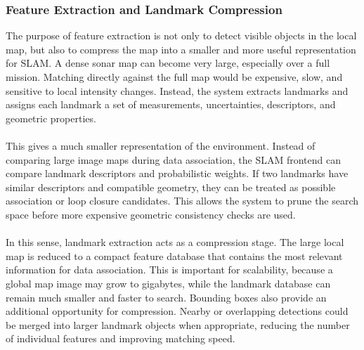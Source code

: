 \subsubsection{Feature Extraction and Landmark Compression}
The purpose of feature extraction is not only to detect visible objects in the local map, but also to compress the map into a smaller and more useful representation for SLAM. A dense sonar map can become very large, especially over a full mission. Matching directly against the full map would be expensive, slow, and sensitive to local intensity changes. Instead, the system extracts landmarks and assigns each landmark a set of measurements, uncertainties, descriptors, and geometric properties.
\\ \\
This gives a much smaller representation of the environment. Instead of comparing large image maps during data association, the SLAM frontend can compare landmark descriptors and probabilistic weights. If two landmarks have similar descriptors and compatible geometry, they can be treated as possible association or loop closure candidates. This allows the system to prune the search space before more expensive geometric consistency checks are used.
\\ \\
In this sense, landmark extraction acts as a compression stage. The large local map is reduced to a compact feature database that contains the most relevant information for data association. This is important for scalability, because a global map image may grow to gigabytes, while the landmark database can remain much smaller and faster to search. Bounding boxes also provide an additional opportunity for compression. Nearby or overlapping detections could be merged into larger landmark objects when appropriate, reducing the number of individual features and improving matching speed.

